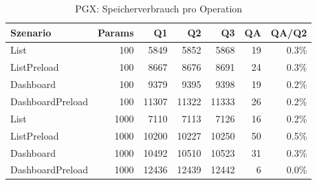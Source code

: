 \begin{table}[ht]
\centering
\caption{PGX: Speicherverbrauch pro Operation}
\begin{tabular}{lrrrrrr}
\toprule
Szenario & Params & Q1 & Q2 & Q3 & QA & QA/Q2 \\
\midrule
		List & 100 & 5849 & 5852 & 5868 & 19 & 0.3\% \\
		ListPreload & 100 & 8667 & 8676 & 8691 & 24 & 0.3\% \\
		Dashboard & 100 & 9379 & 9395 & 9398 & 19 & 0.2\% \\
		DashboardPreload & 100 & 11307 & 11322 & 11333 & 26 & 0.2\% \\
		List & 1000 & 7110 & 7113 & 7126 & 16 & 0.2\% \\
		ListPreload & 1000 & 10200 & 10227 & 10250 & 50 & 0.5\% \\
		Dashboard & 1000 & 10492 & 10510 & 10523 & 31 & 0.3\% \\
		DashboardPreload & 1000 & 12436 & 12439 & 12442 & 6 & 0.0\% \\
\bottomrule
\end{tabular}
\label{tab:benchmark_pgx_bytesperop}
\end{table}
	